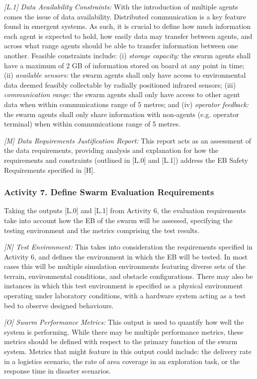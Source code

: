 \documentclass[runningheads]{llncs}
\begin{document}
\emph{[L.1] Data Availability Constraints:}
With the introduction of multiple agents comes the issue of data availability. Distributed communication is a key feature found in emergent systems. As such, it is crucial to define how much information each agent is expected to hold, how easily data may transfer between agents, and across what range agents should be able to transfer information between one another. Feasible constraints include: (i) \emph{storage capacity: }the swarm agents shall have a maximum of 2 GB of information stored on board at any point in time; (ii) \emph{available sensors:} the swarm agents shall only have access to environmental data deemed feasibly collectable by radially positioned infrared sensors; (iii) \emph{communication range:} the swarm agents shall only have access to other agent data when within communications range of 5 metres; and (iv) \emph{operator feedback:} the swarm agents shall only share information with non-agents (e.g. operator terminal) when within communications range of 5 metres.

\emph{[M] Data Requirements Justification Report:}
This report acts as an assessment of the data requirements, providing analysis and explanation for how the requirements and constraints (outlined in [L.0] and [L.1]) address the EB Safety Requirements specified in [H].

\subsubsection*{Activity 7. Define Swarm Evaluation Requirements}

Taking the outputs [L.0] and [L.1] from Activity 6, the evaluation requirements take into account how the EB of the swarm will be assessed, specifying the testing environment and the metrics comprising the test results.  

\emph{[N] Test Environment:} This takes into consideration the requirements specified in Activity 6, and defines the environment in which the EB will be tested. In most cases this will be multiple simulation environments featuring diverse sets of the terrain, environmental conditions, and obstacle configurations. There may also be instances in which this test environment is specified as a physical environment operating under laboratory conditions, with a hardware system acting as a test bed to observe designed behaviours.

\emph{[O] Swarm Performance Metrics:} This output is used to quantify how well the system is performing. While there may be multiple performance metrics, these metrics should be defined with respect to the primary function of the swarm system. Metrics that might feature in this output could include: the delivery rate in a logistics scenario, the rate of area coverage in an exploration task, or the response time in disaster scenarios.
\end{document}

